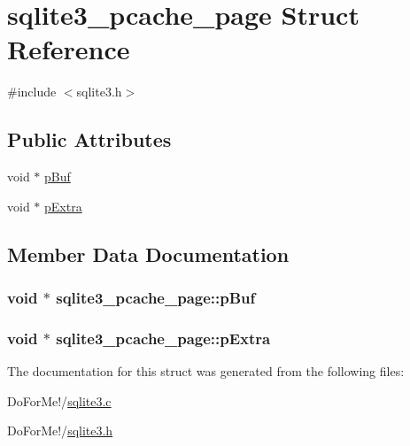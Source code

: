 \hypertarget{structsqlite3__pcache__page}{\section{sqlite3\-\_\-pcache\-\_\-page Struct Reference}
\label{structsqlite3__pcache__page}
}


{\ttfamily \#include $<$sqlite3.\-h$>$}

\subsection*{Public Attributes}
\begin{DoxyCompactItemize}
\item 
void $\ast$ \hyperlink{structsqlite3__pcache__page_aa5446325077c05e4b242c8e2d0faba3b}{p\-Buf}
\item 
void $\ast$ \hyperlink{structsqlite3__pcache__page_a96d7b0314d02837dd6a5e7057912f74f}{p\-Extra}
\end{DoxyCompactItemize}


\subsection{Member Data Documentation}
\hypertarget{structsqlite3__pcache__page_aa5446325077c05e4b242c8e2d0faba3b}{
\subsubsection[{p\-Buf}]{\setlength{\rightskip}{0pt plus 5cm}void $\ast$ sqlite3\-\_\-pcache\-\_\-page\-::p\-Buf}}\label{structsqlite3__pcache__page_aa5446325077c05e4b242c8e2d0faba3b}
\hypertarget{structsqlite3__pcache__page_a96d7b0314d02837dd6a5e7057912f74f}{
\subsubsection[{p\-Extra}]{\setlength{\rightskip}{0pt plus 5cm}void $\ast$ sqlite3\-\_\-pcache\-\_\-page\-::p\-Extra}}\label{structsqlite3__pcache__page_a96d7b0314d02837dd6a5e7057912f74f}


The documentation for this struct was generated from the following files\-:\begin{DoxyCompactItemize}
\item 
Do\-For\-Me!/\hyperlink{sqlite3_8c}{sqlite3.\-c}\item 
Do\-For\-Me!/\hyperlink{sqlite3_8h}{sqlite3.\-h}\end{DoxyCompactItemize}

